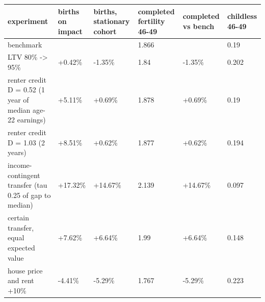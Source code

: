 \begingroup\small
\setlength{\tabcolsep}{3pt}
\renewcommand{\arraystretch}{1.04}
\begin{tabularx}{\linewidth}{XXXXXX}
\toprule
experiment & births on impact & births, stationary cohort & completed fertility 46-49 & completed vs bench & childless 46-49 \\
\midrule
benchmark &  &  & 1.866 &  & 0.19 \\
LTV 80\% -\textgreater{} 95\% & +0.42\% & -1.35\% & 1.84 & -1.35\% & 0.202 \\
renter credit D = 0.52 (1 year of median age-22 earnings) & +5.11\% & +0.69\% & 1.878 & +0.69\% & 0.19 \\
renter credit D = 1.03 (2 years) & +8.51\% & +0.62\% & 1.877 & +0.62\% & 0.194 \\
income-contingent transfer (tau 0.25 of gap to median) & +17.32\% & +14.67\% & 2.139 & +14.67\% & 0.097 \\
certain transfer, equal expected value & +7.62\% & +6.64\% & 1.99 & +6.64\% & 0.148 \\
house price and rent +10\% & -4.41\% & -5.29\% & 1.767 & -5.29\% & 0.223 \\
\bottomrule
\end{tabularx}
\endgroup
